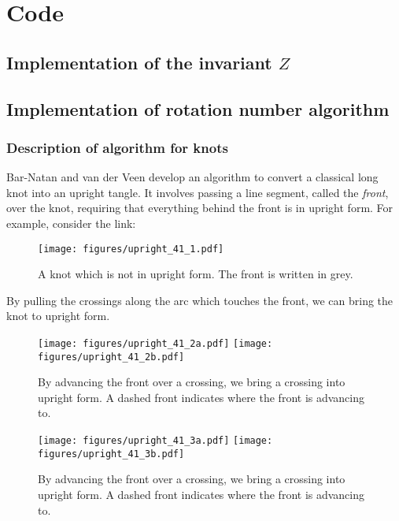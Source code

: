 \chapter{Code}
\section{Implementation of the invariant $Z$}



\section{Implementation of rotation number algorithm}


\subsection{Description of algorithm for knots}

Bar-Natan and van der Veen develop an algorithm to convert a classical long knot
into an upright tangle. It involves passing a line segment, called the
\emph{front}, over the knot, requiring that everything behind the front is in
upright form. For example, consider the link:
\begin{figure}[h]
        \centering
        \texttt{[image: figures/upright\_41\_1.pdf]}
        \caption{A knot which is not in upright form. The front is written in
        grey.}
        \label{fig:figures-upright_41_1}
\end{figure}
By pulling the crossings along the arc which touches the front, we can bring the
knot to upright form.
\begin{figure}[h]
        \centering
        \texttt{[image: figures/upright\_41\_2a.pdf]}
        \texttt{[image: figures/upright\_41\_2b.pdf]}
        \caption{By advancing the front over a crossing, we bring a crossing
        into upright form. A dashed front indicates where the front is advancing
        to.
        }
        \label{fig:figures-upright_41_2}
\end{figure}
\begin{figure}[h]
        \centering
        \texttt{[image: figures/upright\_41\_3a.pdf]}
        \texttt{[image: figures/upright\_41\_3b.pdf]}
        \caption{By advancing the front over a crossing, we bring a crossing
        into upright form. A dashed front indicates where the front is advancing
        to.
        }
        \label{fig:figures-upright_41_3}
\end{figure}

